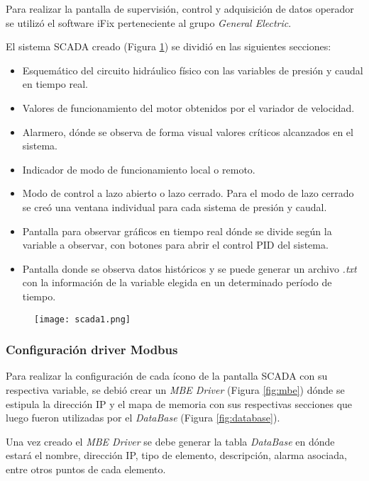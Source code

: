 Para realizar la pantalla de supervisión, control y adquisición de datos operador se utilizó el software iFix perteneciente al grupo \textit{General Electric}.

El sistema SCADA creado (Figura \ref{fig:scada1}) se dividió en las siguientes secciones:
\begin{itemize}
	\item Esquemático del circuito hidráulico físico con las variables de presión y caudal en tiempo real.
	\item Valores de funcionamiento del motor obtenidos por el variador de velocidad.
	\item Alarmero, dónde se observa de forma visual valores críticos alcanzados en el sistema.
	\item Indicador de modo de funcionamiento local o remoto.
	\item Modo de control a lazo abierto o lazo cerrado.
	\subitem Para el modo de lazo cerrado se creó una ventana individual para cada sistema de presión y caudal.
	\item Pantalla para observar gráficos en tiempo real dónde se divide según la variable a observar, con botones para abrir el control PID del sistema.
	\item Pantalla donde se observa datos históricos y se puede generar un archivo \textit{.txt} con la información de la variable elegida en un determinado período de tiempo.
\end{itemize} 

\begin{figure}[htb]
	\centering
	\texttt{[image: scada1.png]}
	\label{fig:scada1}
\end{figure}


\subsubsection{Configuración driver Modbus}
Para realizar la configuración de cada ícono de la pantalla SCADA con su respectiva variable, se debió crear un \textit{MBE Driver} (Figura \ref{fig:mbe}) dónde se estipula la dirección IP y el mapa de memoria con sus respectivas secciones que luego fueron utilizadas por el \textit{DataBase} (Figura \ref{fig:database}). 

Una vez creado el \textit{MBE Driver} se debe generar la tabla \textit{DataBase} en dónde estará el nombre, dirección IP, tipo de elemento, descripción, alarma asociada, entre otros puntos de cada elemento.

